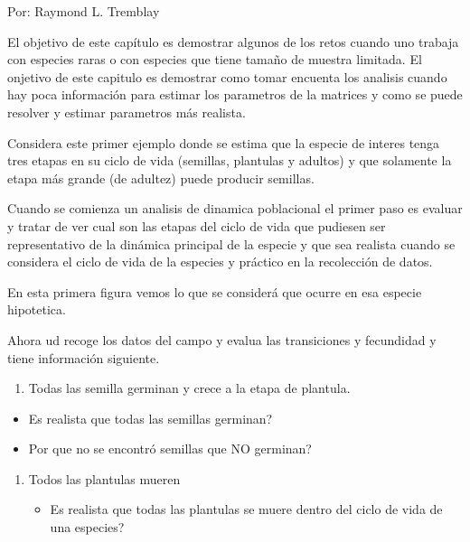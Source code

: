 \documentclass[
]{book}
\providecommand{\tightlist}{%
  \setlength{\itemsep}{0pt}\setlength{\parskip}{0pt}}
\theoremstyle{definition}
\theoremstyle{definition}
\theoremstyle{definition}
\theoremstyle{definition}
\theoremstyle{remark}
\begin{document}
Por: Raymond L. Tremblay

El objetivo de este capítulo es demostrar algunos de los retos cuando uno trabaja con especies raras o con especies que tiene tamaño de muestra limitada. El onjetivo de este capitulo es demostrar como tomar encuenta los analisis cuando hay poca información para estimar los parametros de la matrices y como se puede resolver y estimar parametros más realista.

Considera este primer ejemplo donde se estima que la especie de interes tenga tres etapas en su ciclo de vida (semillas, plantulas y adultos) y que solamente la etapa más grande (de adultez) puede producir semillas.

Cuando se comienza un analisis de dinamica poblacional el primer paso es evaluar y tratar de ver cual son las etapas del ciclo de vida que pudiesen ser representativo de la dinámica principal de la especie y que sea realista cuando se considera el ciclo de vida de la especies y práctico en la recolección de datos.

En esta primera figura vemos lo que se considerá que ocurre en esa especie hipotetica.

Ahora ud recoge los datos del campo y evalua las transiciones y fecundidad y tiene información siguiente.

\begin{enumerate}
\def\labelenumi{\arabic{enumi}.}
\tightlist
\item
  Todas las semilla germinan y crece a la etapa de plantula.\\
\end{enumerate}

\begin{itemize}
\tightlist
\item
  Es realista que todas las semillas germinan?
\item
  Por que no se encontró semillas que NO germinan?
\end{itemize}

\begin{enumerate}
\def\labelenumi{\arabic{enumi}.}
\setcounter{enumi}{1}
\tightlist
\item
  Todos las plantulas mueren

  \begin{itemize}
  \tightlist
  \item
    Es realista que todas las plantulas se muere dentro del ciclo de vida de una especies?
  \end{itemize}
\end{enumerate}
\end{document}
